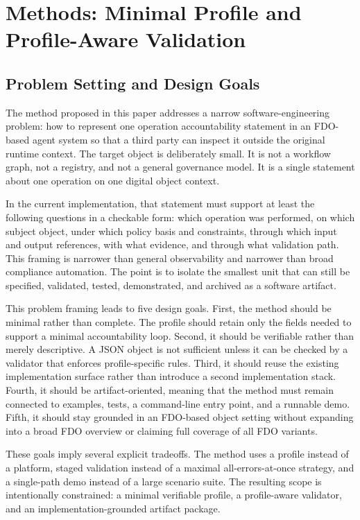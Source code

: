 \section{Methods: Minimal Profile and Profile-Aware Validation}

\subsection{Problem Setting and Design Goals}

The method proposed in this paper addresses a narrow software-engineering problem: how to represent one operation accountability statement in an FDO-based agent system so that a third party can inspect it outside the original runtime context. The target object is deliberately small. It is not a workflow graph, not a registry, and not a general governance model. It is a single statement about one operation on one digital object context.

In the current implementation, that statement must support at least the following questions in a checkable form: which operation was performed, on which subject object, under which policy basis and constraints, through which input and output references, with what evidence, and through what validation path. This framing is narrower than general observability and narrower than broad compliance automation. The point is to isolate the smallest unit that can still be specified, validated, tested, demonstrated, and archived as a software artifact.

This problem framing leads to five design goals. First, the method should be minimal rather than complete. The profile should retain only the fields needed to support a minimal accountability loop. Second, it should be verifiable rather than merely descriptive. A JSON object is not sufficient unless it can be checked by a validator that enforces profile-specific rules. Third, it should reuse the existing implementation surface rather than introduce a second implementation stack. Fourth, it should be artifact-oriented, meaning that the method must remain connected to examples, tests, a command-line entry point, and a runnable demo. Fifth, it should stay grounded in an FDO-based object setting without expanding into a broad FDO overview or claiming full coverage of all FDO variants.

These goals imply several explicit tradeoffs. The method uses a profile instead of a platform, staged validation instead of a maximal all-errors-at-once strategy, and a single-path demo instead of a large scenario suite. The resulting scope is intentionally constrained: a minimal verifiable profile, a profile-aware validator, and an implementation-grounded artifact package.


